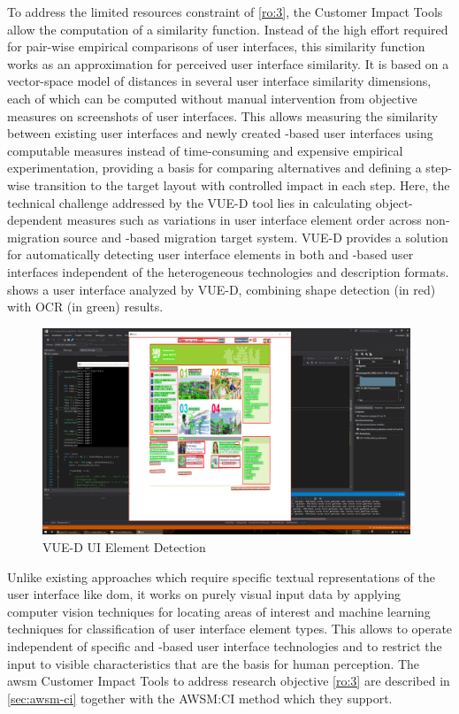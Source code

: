 To address the limited resources constraint of \cref{ro:3}, the Customer Impact Tools allow the computation of a similarity function.
Instead of the high effort required for pair-wise empirical comparisons of user interfaces, this similarity function works as an approximation for perceived user interface similarity.
It is based on a vector-space model of distances in several user interface similarity dimensions, each of which can be computed without manual intervention from objective measures on screenshots of user interfaces.
This allows measuring the similarity between existing  user interfaces and newly created -based user interfaces using computable measures instead of time-consuming and expensive empirical experimentation, providing a basis for comparing alternatives and defining a step-wise transition to the target layout with controlled impact in each step.
Here, the technical challenge addressed by the  VUE-D tool lies in calculating object-dependent measures such as variations in user interface element order across non- migration source and -based migration \gls{target system}.
VUE-D provides a solution for automatically detecting user interface elements in both  and -based user interfaces independent of the heterogeneous technologies and description formats.
 shows a \web user interface analyzed by VUE-D, combining shape detection (in red) with OCR (in green) results.
\begin{figure}[h!]
\hypertarget{fig:vue-d}{%
\centering
\includegraphics[width=0.98\textwidth]{../figures/screenshots/UI-Element-Recognition.png}
\caption{VUE-D UI Element Detection}\label{fig:vue-d}
}
\end{figure}
Unlike existing approaches which require specific textual representations of the user interface like \gls{dom}, it works on purely visual input data by applying computer vision techniques for locating areas of interest and machine learning techniques for classification of user interface element types.
This allows to operate independent of specific  and -based user interface technologies and to restrict the input to visible characteristics that are the basis for human perception.
The \gls{awsm} Customer Impact Tools to address research objective \cref{ro:3} are described in \cref{sec:awsm-ci} together with the AWSM:CI method which they support.

